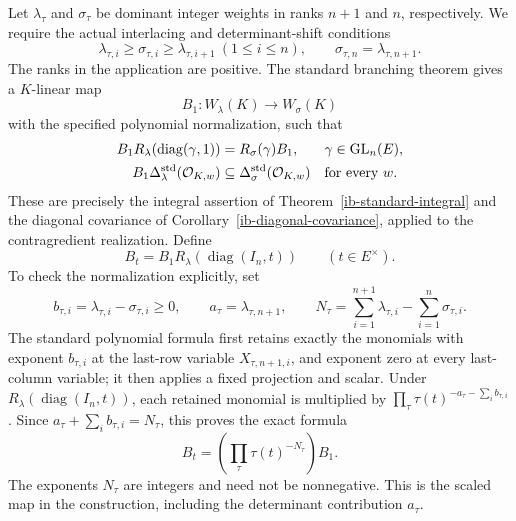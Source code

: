 Let $\lambda_\tau$ and $\sigma_\tau$ be dominant integer
weights in ranks $n+1$ and $n$, respectively.  We require
the actual interlacing and determinant-shift conditions
\begin{equation}\label{atl-weights}
 \lambda_{\tau,i}\geq\sigma_{\tau,i}
                       \geq\lambda_{\tau,i+1}\ (1\leq i\leq n),
               \qquad \sigma_{\tau,n}=\lambda_{\tau,n+1}.
\end{equation}
The ranks in the application are positive.  The standard
branching theorem gives a $K$-linear map
\[
 B_1:W_\lambda(K)\longrightarrow W_\sigma(K)
\]
with the specified polynomial normalization, such that
\begin{align}
 B_1R_\lambda(\operatorname{diag}(\gamma,1))
                &=R_\sigma(\gamma)B_1,
                    &&\gamma\in\operatorname{GL}_n(E),
                         \label{atl-standard-covariance}\\
 B_1\Delta_\lambda^{\rm std}(\mathcal O_{K,w})
                &\subseteq\Delta_\sigma^{\rm std}(\mathcal O_{K,w})
                    &&\text{for every }w.
                         \label{atl-standard-integral}
\end{align}
These are precisely the integral assertion of
Theorem~\ref{ib-standard-integral} and the diagonal
covariance of Corollary~\ref{ib-diagonal-covariance}, applied
to the contragredient realization.  Define
\begin{equation}\label{atl-scaled-map}
                 B_t=B_1R_\lambda(\operatorname{diag}(I_n,t))
                         \qquad(t\in E^\times).
\end{equation}
To check the normalization explicitly, set
\[
 b_{\tau,i}=\lambda_{\tau,i}-\sigma_{\tau,i}\geq0,
 \qquad a_\tau=\lambda_{\tau,n+1},\qquad
 N_\tau=\sum_{i=1}^{n+1}\lambda_{\tau,i}
                              -\sum_{i=1}^n\sigma_{\tau,i}.
\]
The standard polynomial formula first retains exactly the
monomials with exponent $b_{\tau,i}$ at the last-row variable
$X_{\tau,n+1,i}$, and exponent zero at every last-column
variable; it then applies a fixed projection and scalar.
Under $R_\lambda(\operatorname{diag}(I_n,t))$, each retained
monomial is multiplied by
$\prod_\tau\tau(t)^{-a_\tau-\sum_i b_{\tau,i}}$.
Since $a_\tau+\sum_i b_{\tau,i}=N_\tau$, this proves the
exact formula
\begin{equation}\label{atl-scaled-factor}
                      B_t=\left(\prod_\tau\tau(t)^{-N_\tau}\right)B_1.
\end{equation}
The exponents $N_\tau$ are integers and need not be
nonnegative.  This is the scaled map in the construction,
including the determinant contribution $a_\tau$.

